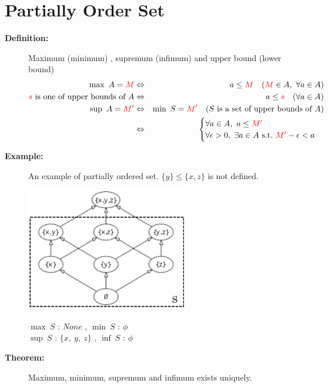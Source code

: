 \documentclass[english,dvipdfmx]{jsarticle}
\begin{document}
\section{Partially Order Set}
\begin{description}
    \item[\bf{Definition:}] Maximum (minimum) , supremum (infimum) and upper bound (lower bound)
    \begin{eqnarray*}
    \max \ A = {\color{red}M}  &\Leftrightarrow& a \leq {\color{red}M} \quad ( {\color{red}M} \in A ,\ \forall a \in A )  \\
    {\color{red}{s}} \text{ is one of upper bounds of } A &\Leftrightarrow& a \leq {\color{red}{s}} \quad ( \forall a \in A ) \\
    \sup \ A = {\color{red}M'} &\Leftrightarrow& \min \ S = {\color{red}M'} \quad ( S \text{ is a set of upper bounds of }A ) \\
    &\Leftrightarrow& \begin{cases}  \forall a \in A  ,\ a \leq {\color{red}M'} \\ \forall \epsilon > 0 ,\ \exists a \in A \ \text{s.t.} \ {\color{red}M'} - \epsilon < a \end{cases}
    \end{eqnarray*}
    \item[\bf{Example:}] An example of partially ordered set. $ \{ y \} \leq \{ x,z \} $ is not defined. \\
        \begin{minipage}{.4\textwidth}
            \centering\includegraphics[width=7cm]{./set.png}
            \end{minipage}
            \hfill
            \begin{minipage}{.4\textwidth}
        $\max \ S$ : $None$ , $\min \ S$ : $\phi$\\
        $\sup \ S$ : $\{ x,\ y,\ z \}$ , $\inf \ S$ : $\phi$
        \end{minipage}
    \item[\bf{Theorem:}] Maximum, minimum, supremum and infimum exists uniquely.\\

\end{description}
\end{document}
